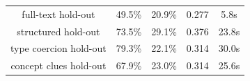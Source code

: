 \documentclass{poster15}
\begin{document}
\begin{figure}[t]
\begin{tabular}{|c|cccc|}
\hline
full-text hold-out & 49.5\% & 20.9\% & 0.277 & 5.8s \\

structured hold-out & 73.5\% & 29.1\% & 0.376 & 23.8s \\

type coercion hold-out & 79.3\% & 22.1\% & 0.314 & 30.0s \\

concept clues hold-out & 67.9\% & 23.0\% & 0.314 & 25.6s \\




\end{tabular}
\end{figure}
\end{document}
